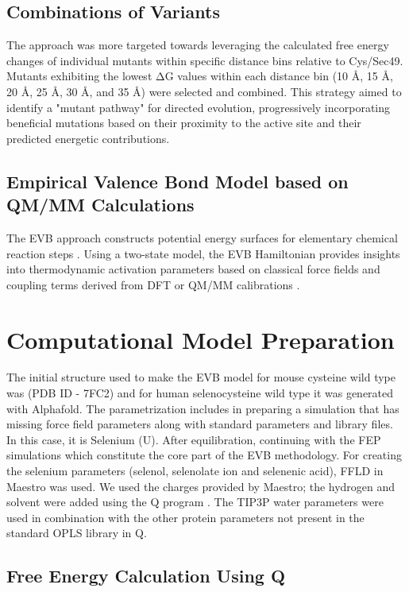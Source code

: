 \documentclass[journal=jacsat,manuscript=article]{achemso}
\begin{document}
\subsection{Combinations of Variants}

The approach was more targeted towards leveraging the calculated free energy changes of individual mutants within specific distance bins relative to Cys/Sec49. Mutants exhibiting the lowest ΔG values within each distance bin (10 Å, 15 Å, 20 Å, 25 Å, 30 Å, and 35 Å) were selected and combined. This strategy aimed to identify a "mutant pathway" for directed evolution, progressively incorporating beneficial mutations based on their proximity to the active site and their predicted energetic contributions.

\subsection{Empirical Valence Bond Model based on QM/MM Calculations}

The EVB approach constructs potential energy surfaces for elementary chemical reaction steps \cite{Oanca2024}. Using a two-state model, the EVB Hamiltonian provides insights into thermodynamic activation parameters based on classical force fields and coupling terms derived from DFT or QM/MM calibrations \cite{Oanca2023}.

\section{Computational Model Preparation}

The initial structure used to make the EVB model for mouse cysteine wild type was (PDB ID - 7FC2) and for human selenocysteine wild type it was generated with Alphafold. The parametrization includes in preparing a simulation that has missing force field parameters along with standard parameters and library files. In this case, it is Selenium (U). After equilibration, continuing with the FEP simulations which constitute the core part of the EVB methodology. For creating the selenium parameters (selenol, selenolate ion and selenenic acid), FFLD in Maestro was used. We used the charges provided by Maestro; the hydrogen and solvent were added using the Q program \cite{Marelius1999}. The TIP3P water parameters were used in combination with the other protein parameters not present in the standard OPLS library in Q.

\subsection{Free Energy Calculation Using Q}
\end{document}
